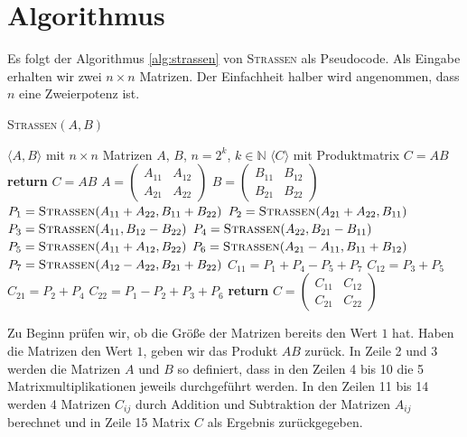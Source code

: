 \documentclass{scrartcl}
\numberwithin{equation}{section}
\begin{document}
\section{Algorithmus}
Es folgt der Algorithmus \ref{alg:strassen} von \textsc{Strassen}  als Pseudocode. Als Eingabe erhalten wir zwei $n \times n$ Matrizen. Der Einfachheit halber wird angenommen, dass $n$ eine Zweierpotenz ist.
\begin{algorithm}
	\caption{\textsc{Strassen}$(A, B)$}
	\label{alg:strassen}
	\begin{algorithmic}[1]
		\Require $\langle A, B \rangle$ mit $n \times n$ Matrizen $A$, $B$, $n = 2^k$, $k \in \mathbb{N}$
		\Ensure $\langle C \rangle$ mit Produktmatrix $C = AB$
		 \textbf{return} $C = AB$
		\EndIf
		\State $A = \begin{pmatrix} A_{11} & A_{12} \\ A_{21} & A_{22} \end{pmatrix}$
		\State $B = \begin{pmatrix} B_{11} & B_{12} \\ B_{21} & B_{22} \end{pmatrix}$
		\State $P_1 = \textsc{Strassen}(A_{11} + A_{22}, B_{11} + B_{22})$
		\State $P_2 = \textsc{Strassen}(A_{21} + A_{22}, B_{11})$
		\State $P_3 = \textsc{Strassen}(A_{11}, B_{12} - B_{22})$
		\State $P_4 = \textsc{Strassen}(A_{22}, B_{21} - B_{11})$
		\State $P_5 = \textsc{Strassen}(A_{11} + A_{12}, B_{22})$
		\State $P_6 = \textsc{Strassen}(A_{21} - A_{11}, B_{11} + B_{12})$
		\State $P_7 = \textsc{Strassen}(A_{12} - A_{22}, B_{21} + B_{22})$
		\State $C_{11} = P_1 + P_4 - P_5 + P_7$
		\State $C_{12} = P_3 + P_5$
		\State $C_{21} = P_2 + P_4$
		\State $C_{22} = P_1 - P_2 + P_3 + P_6$
		\State \textbf{return} $C = \begin{pmatrix} C_{11} & C_{12} \\ C_{21} & C_{22} \end{pmatrix}$
	\end{algorithmic}
\end{algorithm}
Zu Beginn prüfen wir, ob die Größe der Matrizen bereits den Wert $1$ hat. Haben die Matrizen den Wert $1$, geben wir das Produkt $A B$ zurück. In Zeile 2 und 3 werden die Matrizen $A$ und $B$ so definiert, dass in den Zeilen 4 bis 10 die 5 Matrixmultiplikationen jeweils durchgeführt werden. In den Zeilen 11 bis 14 werden 4 Matrizen $C_{ij}$ durch Addition und Subtraktion der Matrizen $A_{ij}$ berechnet und in Zeile 15 Matrix $C$ als Ergebnis zurückgegeben.
\end{document}
